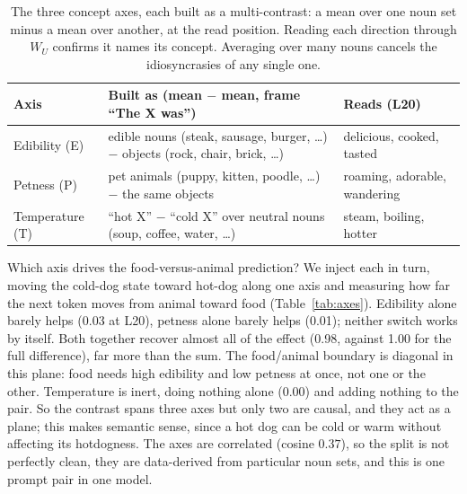 \documentclass[11pt]{article}
\newcommand{\WU}{W_U}
\begin{document}
\begin{table}[htbp]
\centering
\small
\begin{tabularx}{\columnwidth}{@{}lYl@{}}
\toprule
Axis & Built as (mean $-$ mean, frame ``The X was'') & Reads (L20) \\
\midrule
Edibility (E)   & edible nouns (steak, sausage, burger, \ldots) $-$ objects (rock, chair, brick, \ldots) & delicious, cooked, tasted \\
Petness (P)     & pet animals (puppy, kitten, poodle, \ldots) $-$ the same objects & roaming, adorable, wandering \\
Temperature (T) & ``hot X'' $-$ ``cold X'' over neutral nouns (soup, coffee, water, \ldots) & steam, boiling, hotter \\
\bottomrule
\end{tabularx}
\caption{The three concept axes, each built as a multi-contrast: a mean over one
noun set minus a mean over another, at the read position. Reading each direction
through $\WU$ confirms it names its concept. Averaging over many nouns cancels
the idiosyncrasies of any single one.}
\label{tab:axes-build}
\end{table}

Which axis drives the food-versus-animal prediction? We inject each in turn,
moving the cold-dog state toward hot-dog along one axis and measuring how far the
next token moves from animal toward food (Table~\ref{tab:axes}). Edibility alone
barely helps (0.03 at L20), petness alone barely helps (0.01); neither switch
works by itself. Both together recover almost all of the effect (0.98, against
1.00 for the full difference), far more than the sum. The food/animal boundary is
diagonal in this plane: food needs high edibility and low petness at once, not
one or the other. Temperature is inert, doing nothing alone (0.00) and adding
nothing to the pair. So the contrast spans three axes but only two are causal,
and they act as a plane; this makes semantic sense, since a hot dog can be cold
or warm without affecting its hotdogness. The axes are correlated (cosine
$0.37$), so the split is not perfectly clean, they are data-derived from
particular noun sets, and this is one prompt pair in one model.
\end{document}
